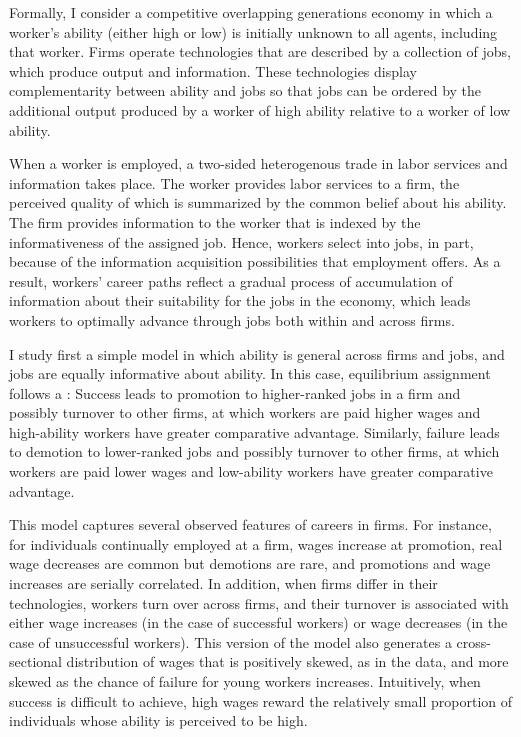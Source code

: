 \documentclass[12pt]{article}
\newcommand{\highlightR}[1]{{\emph{\color{MyRed}{#1}}}}
\newcommand{\highlightB}[1]{{\emph{\color{MyBlue}{#1}}}}
\theoremstyle{definition}
\begin{document}
\highlightR{Notes: I don't really understand how this mechanism leads to discrete increase in wages.}

Formally, I consider a competitive overlapping generations economy in which a worker's ability (either high or low) is initially unknown to all agents, including that worker. Firms operate technologies that are described by a collection of jobs, which produce output and information. These technologies display complementarity between ability and jobs so that jobs can be ordered by the additional output produced by a worker of high ability relative to a worker of low ability. 

When a worker is employed, a two-sided heterogenous trade in labor services and information takes place. The worker provides labor services to a firm, the perceived quality of which is summarized by the common belief about his ability. The firm provides information to the worker that is indexed by the informativeness of the assigned job. Hence, workers select into jobs, in part, because of the information acquisition possibilities that employment offers. As a result, workers' career paths reflect a gradual process of accumulation of information about their suitability for the jobs in the economy, which leads workers to optimally advance through jobs both within and across firms. 

I study first a simple \highlightB{general ability} model in which ability is general across firms and jobs, and jobs are equally informative about ability. In this case, equilibrium assignment follows a \highlightB{hierarchy rule}: Success leads to promotion to higher-ranked jobs in a firm and possibly turnover to other firms, at which workers are paid higher wages and high-ability workers have greater comparative advantage. Similarly, failure leads to demotion to lower-ranked jobs and possibly turnover to other firms, at which workers are paid lower wages and low-ability workers have greater comparative advantage.

This model captures several observed features of careers in firms. For instance, for individuals continually employed at a firm, wages increase at promotion, real wage decreases are common but demotions are rare, and promotions and wage increases are serially correlated. In addition, when firms differ in their technologies, workers turn over across firms, and their turnover is associated with either wage increases (in the case of successful workers) or wage decreases (in the case of unsuccessful workers). This version of the model also generates a cross-sectional distribution of wages that is positively skewed, as in the data, and more skewed as the chance of failure for young workers increases. Intuitively, when success is difficult to achieve, high wages reward the relatively small proportion of individuals whose ability is perceived to be high. 
\end{document}
